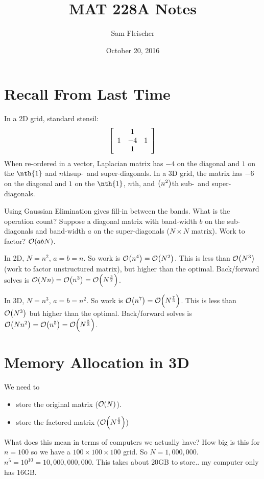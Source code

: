 \documentclass{article}
\title{MAT 228A Notes}
\author{Sam Fleischer}
\date{October 20, 2016}
\newcommand{\enth}{$n$th}
\begin{document}
    \maketitle

    \section{Recall From Last Time}
        In a 2D grid, standard stensil:
        \begin{align}
            \qty[\begin{array}{ccc}
                & 1 & \\
                1 & -4 & 1 \\
                & 1 &
            \end{array}]
        \end{align}
        When re-ordered in a vector, Laplacian matrix has $-4$ on the diagonal and $1$ on the $\nth{1}$ and \enth sup-~and super-diagonals.  In a 3D grid, the matrix has $-6$ on the diagonal and $1$ on the $\nth{1}$, \enth, and $\qty(n^2)$th sub-~and super-diagonals.

        Using Gaussian Elimination gives fill-in between the bands.  What is the operation count?  Suppose a diagonal matrix with band-width $b$ on the sub-diagonals and band-width $a$ on the super-diagonals ($N\times N$ matrix).  Work to factor?  $\order{abN}$.

        In 2D, $N = n^2$, $a = b = n$.  So work is $\order{n^4} = \order{N^2}$.  This is less than $\order{N^3}$ (work to factor unstructured matrix), but higher than the optimal.  Back/forward solves is $\order{Nn} = \order{n^3} = \order{N^{\frac{3}{2}}}$.

        In 3D, $N = n^3$, $a = b = n^2$.  So work is $\order{n^7} = \order{N^{\frac{7}{3}}}$.  This is less than $\order{N^3}$ but higher than the optimal.  Back/forward solves is $\order{Nn^2} = \order{n^5} = \order{N^{\frac{5}{3}}}$.

    \section{Memory Allocation in 3D}
        We need to 
        \begin{itemize}
            \item store the original matrix ($\order{N}$).
            \item store the factored matrix ($\order{N^{\frac{5}{3}}}$)
        \end{itemize}
        What does this mean in terms of computers we actually have?  How big is this for $n = 100$ so we have a $100\times100\times100$ grid.  So $N = 1,000,000$.  $n^5 = 10^{10} = 10,000,000,000$.  This takes about $20$GB to store.. my computer only has $16$GB.
\end{document}
